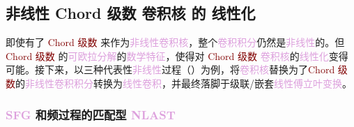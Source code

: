 \subsection{非线性 Chord 级数 卷积核 的 线性化}\label{ssec:NLAST_chord}

即使有了 \textcolor{Maroon}{Chord 级数} 来作为\textcolor{Plum}{非线性}\textcolor{Plum}{卷积核}，整个\textcolor{Plum}{卷积积分}仍然是\textcolor{Plum}{非线性}的。但 \textcolor{Maroon}{Chord 级数} 的\textcolor{Plum}{可欧拉分解}的\textcolor{Plum}{数学特征}，使得对 \textcolor{Maroon}{Chord 级数} \textcolor{Plum}{卷积核}的\textcolor{Plum}{线性化}变得可能。接下来，以三种代表性\textcolor{Plum}{非线性}过程（）为例，将\textcolor{Plum}{卷积核}替换为了\textcolor{Maroon}{Chord 级数}的\textcolor{Plum}{非线性卷积积分}转换为\textcolor{Plum}{线性卷积}，并最终落脚于级联/嵌套\textcolor{Plum}{线性傅立叶变换}。

\subsubsection{\textcolor{Plum}{SFG} 和频过程的匹配型 \textcolor{Plum}{NLAST}}\label{sssec:NLAST_chord_SFG}

